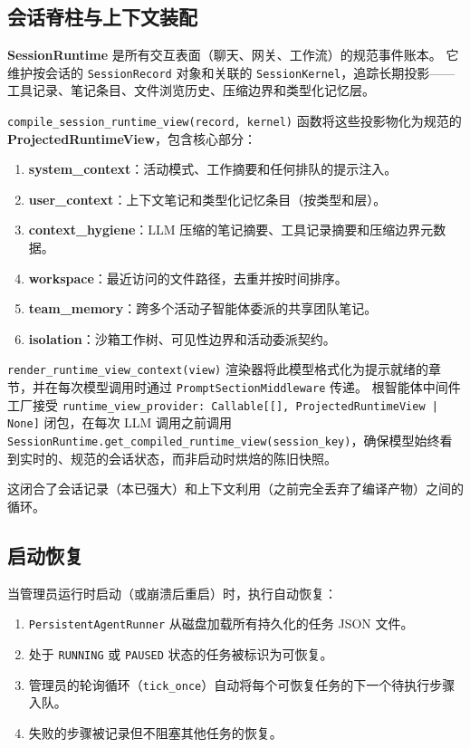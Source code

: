 \documentclass[11pt,a4paper]{article}
\begin{document}
\subsection{会话脊柱与上下文装配}
\label{sec:session-spine}

\textbf{SessionRuntime} 是所有交互表面（聊天、网关、工作流）的规范事件账本。
它维护按会话的 \texttt{SessionRecord} 对象和关联的 \texttt{SessionKernel}，追踪长期投影——工具记录、笔记条目、文件浏览历史、压缩边界和类型化记忆层。

\texttt{compile\_session\_runtime\_view(record, kernel)} 函数将这些投影物化为规范的 \textbf{ProjectedRuntimeView}，包含核心部分：
\begin{enumerate}
  \item \textbf{system\_context}：活动模式、工作摘要和任何排队的提示注入。
  \item \textbf{user\_context}：上下文笔记和类型化记忆条目（按类型和层）。
  \item \textbf{context\_hygiene}：LLM 压缩的笔记摘要、工具记录摘要和压缩边界元数据。
  \item \textbf{workspace}：最近访问的文件路径，去重并按时间排序。
  \item \textbf{team\_memory}：跨多个活动子智能体委派的共享团队笔记。
  \item \textbf{isolation}：沙箱工作树、可见性边界和活动委派契约。
\end{enumerate}

\texttt{render\_runtime\_view\_context(view)} 渲染器将此模型格式化为提示就绪的章节，并在每次模型调用时通过 \texttt{PromptSectionMiddleware} 传递。
根智能体中间件工厂接受 \texttt{runtime\_view\_provider: Callable[[], ProjectedRuntimeView | None]} 闭包，在每次 LLM 调用之前调用 \texttt{SessionRuntime.get\_compiled\_runtime\_view(session\_key)}，确保模型始终看到实时的、规范的会话状态，而非启动时烘焙的陈旧快照。

这闭合了会话记录（本已强大）和上下文利用（之前完全丢弃了编译产物）之间的循环。

\subsection{启动恢复}

当管理员运行时启动（或崩溃后重启）时，执行自动恢复：
\begin{enumerate}
  \item \texttt{PersistentAgentRunner} 从磁盘加载所有持久化的任务 JSON 文件。
  \item 处于 \texttt{RUNNING} 或 \texttt{PAUSED} 状态的任务被标识为可恢复。
  \item 管理员的轮询循环（\texttt{tick\_once}）自动将每个可恢复任务的下一个待执行步骤入队。
  \item 失败的步骤被记录但不阻塞其他任务的恢复。
\end{enumerate}
\end{document}

